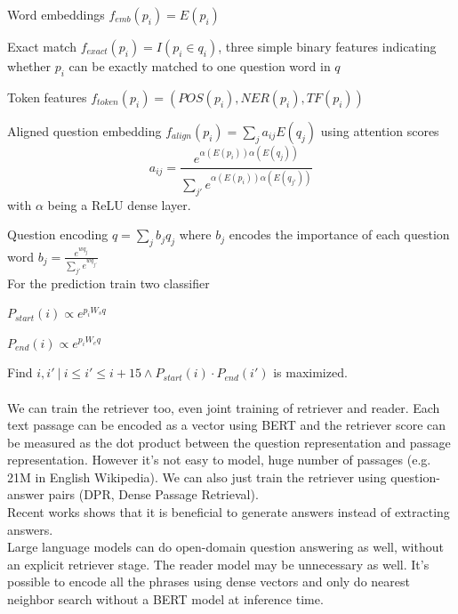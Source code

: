 \documentclass[10pt]{report}
\begin{document}
\begin{list}{}{}
	\item Word embeddings $f_{emb}(p_i) = E(p_i)$
	\item Exact match $f_{exact}(p_i) = I(p_i \in q_i)$, three simple binary features indicating whether $p_i$ can be exactly matched to one question word in $q$
	\item Token features $f_{token}(p_i) = (POS(p_i), NER(p_i), TF(p_i))$
	\item Aligned question embedding $f_{align}(p_i) = \sum_j a_{ij}E(q_j)$ using attention scores $$a_{ij}=\frac{e^{\alpha(E(p_i))\alpha(E(q_j))}}{\sum_{j'}e^{\alpha(E(p_i))\alpha(E(q_{j'}))}}$$ with $\alpha$ being a ReLU dense layer.
\end{list}
Question encoding $q=\sum_jb_jq_j$ where $b_j$ encodes the importance of each question word $b_j=\frac{e^{wq_j}}{\sum_{j'} e^{wq_{j'}}}$\\
For the prediction train two classifier\begin{list}{}{}
	\item $P_{start}(i)\propto e^{p_iW_sq}$
	\item $P_{end}(i)\propto e^{p_iW_eq}$
\end{list}
Find $i,i'\:|\:i\leq i'\leq i+15\wedge P_{start}(i)\cdot P_{end}(i')$ is maximized.\\\\
We can train the retriever too, even joint training of retriever and reader. Each text passage can be encoded as a vector using BERT and the retriever score can be measured as the dot product between the question representation and passage representation. However it's not easy to model, huge number of passages (e.g. 21M in English Wikipedia). We can also just train the retriever using question-answer pairs (DPR, Dense Passage Retrieval).\\
Recent works shows that it is beneficial to generate answers instead of extracting answers.\\
Large language models can do open-domain question answering as well, without an explicit retriever stage. The reader model may be unnecessary as well. It's possible to encode all the phrases using dense vectors and only do nearest neighbor search without a BERT model at inference time.
\end{document}
